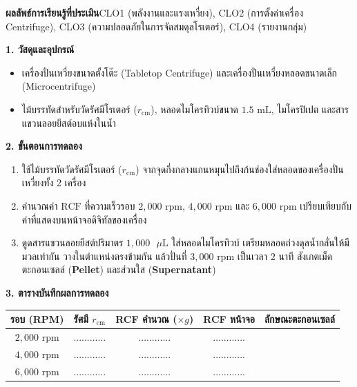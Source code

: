 \begin{labbox}
\noindent\textbf{ผลลัพธ์การเรียนรู้ที่ประเมิน}\quad CLO1 (พลังงานและแรงเหวี่ยง), CLO2 (การตั้งค่าเครื่อง Centrifuge), CLO3 (ความปลอดภัยในการจัดสมดุลโรเตอร์), CLO4 (รายงานกลุ่ม)

\vspace{4pt}
\noindent\textbf{1. วัสดุและอุปกรณ์}
\begin{itemize}
    \item เครื่องปั่นเหวี่ยงขนาดตั้งโต๊ะ (Tabletop Centrifuge) และเครื่องปั่นเหวี่ยงหลอดขนาดเล็ก (Microcentrifuge)
    \item ไม้บรรทัดสำหรับวัดรัศมีโรเตอร์ ($r_{\text{cm}}$), หลอดไมโครทิวบ์ขนาด $1.5\text{ mL}$, ไมโครปิเปต และสารแขวนลอยยีสต์อบแห้งในน้ำ
\end{itemize}

\noindent\textbf{2. ขั้นตอนการทดลอง}
\begin{enumerate}
    \item ใช้ไม้บรรทัดวัดรัศมีโรเตอร์ ($r_{\text{cm}}$) จากจุดกึ่งกลางแกนหมุนไปถึงก้นช่องใส่หลอดของเครื่องปั่นเหวี่ยงทั้ง 2 เครื่อง
    \item คำนวณค่า $\text{RCF}$ ที่ความเร็วรอบ $2{,}000\text{ rpm}$, $4{,}000\text{ rpm}$ และ $6{,}000\text{ rpm}$ เปรียบเทียบกับค่าที่แสดงบนหน้าจอดิจิทัลของเครื่อง
    \item ดูดสารแขวนลอยยีสต์ปริมาตร $1{,}000\text{ }\mu\text{L}$ ใส่หลอดไมโครทิวบ์ เตรียมหลอดถ่วงดุลน้ำกลั่นให้มีมวลเท่ากัน วางในตำแหน่งตรงข้ามกัน แล้วปั่นที่ $3{,}000\text{ rpm}$ เป็นเวลา $2$ นาที สังเกตเม็ดตะกอนเซลล์ (\textbf{Pellet}) และส่วนใส (\textbf{Supernatant})
\end{enumerate}

\noindent\textbf{3. ตารางบันทึกผลการทดลอง}
\begin{center}
\footnotesize\setlength{\tabcolsep}{3.5pt}
\begin{tabularx}{\linewidth}{c c c c >{\raggedright\arraybackslash}X}
\toprule
\textbf{รอบ (RPM)} & \textbf{รัศมี $r_{\text{cm}}$} & \textbf{RCF คำนวณ ($\times g$)} & \textbf{RCF หน้าจอ} & \textbf{ลักษณะตะกอนเซลล์} \\
\midrule
$2{,}000\text{ rpm}$ & ............ & ............ & ............ & \dotfill \\
$4{,}000\text{ rpm}$ & ............ & ............ & ............ & \dotfill \\
$6{,}000\text{ rpm}$ & ............ & ............ & ............ & \dotfill \\
\bottomrule
\end{tabularx}
\end{center}
\end{labbox}

